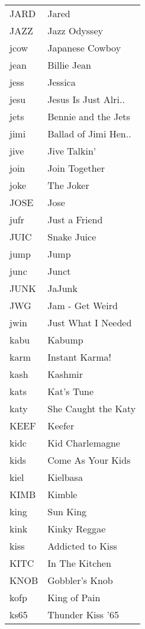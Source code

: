 \begin{supertabular}{ll}
 JARD &                 Jared \\
 JAZZ &          Jazz Odyssey \\
 jcow &       Japanese Cowboy \\
 jean &           Billie Jean \\
 jess &               Jessica \\
 jesu &  Jesus Is Just Alri.. \\
 jets &   Bennie and the Jets \\
 jimi &  Ballad of Jimi Hen.. \\
 jive &          Jive Talkin' \\
 join &         Join Together \\
 joke &             The Joker \\
 JOSE &                  Jose \\
 jufr &         Just a Friend \\
 JUIC &           Snake Juice \\
 jump &                  Jump \\
 junc &                 Junct \\
 JUNK &                JaJunk \\
  JWG &       Jam - Get Weird \\
 jwin &    Just What I Needed \\
 kabu &                Kabump \\
 karm &        Instant Karma! \\
 kash &               Kashmir \\
 kats &            Kat's Tune \\
 katy &   She Caught the Katy \\
 KEEF &                Keefer \\
 kidc &       Kid Charlemagne \\
 kids &     Come As Your Kids \\
 kiel &              Kielbasa \\
 KIMB &                Kimble \\
 king &              Sun King \\
 kink &          Kinky Reggae \\
 kiss &      Addicted to Kiss \\
 KITC &        In The Kitchen \\
 KNOB &        Gobbler's Knob \\
 kofp &          King of Pain \\
 ks65 &      Thunder Kiss '65 \\

\end{supertabular}
